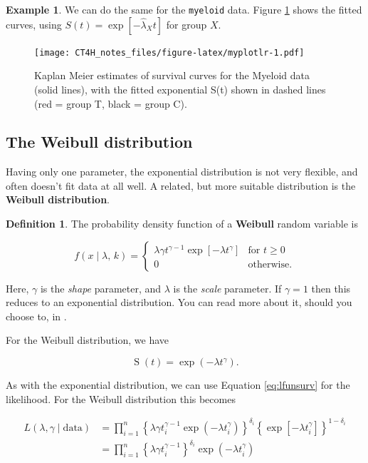 \documentclass[
  openany]{book}
\theoremstyle{definition}
\newtheorem{definition}{Definition}[chapter]
\theoremstyle{definition}
\newtheorem{example}{Example}[chapter]
\theoremstyle{definition}
\theoremstyle{definition}
\theoremstyle{remark}
\begin{document}
\begin{example}
We can do the same for the \texttt{myeloid} data. Figure \ref{fig:myplotlr} shows the fitted curves, using \(S\left(t\right)=\exp\left[-\hat{\lambda}_Xt\right]\) for group \(X\).

\begin{figure}
\centering
\texttt{[image: CT4H\_notes\_files/figure-latex/myplotlr-1.pdf]}
\caption{\label{fig:myplotlr}Kaplan Meier estimates of survival curves for the Myeloid data (solid lines), with the fitted exponential S(t) shown in dashed lines (red = group T, black = group C).}
\end{figure}

\end{example}

\hypertarget{the-weibull-distribution}{%
\subsection{The Weibull distribution}\label{the-weibull-distribution}}

Having only one parameter, the exponential distribution is not very flexible, and often doesn't fit data at all well. A related, but more suitable distribution is the \textbf{Weibull distribution}.

\begin{definition}
The probability density function of a \textbf{Weibull} random variable is

\[
f\left(x\mid \lambda,\,k\right) = 
\begin{cases}
\lambda\gamma t^{\gamma-1}\exp\left[{-\lambda t^{\gamma}}\right] & \text{for }t\geq{0}\\
0 & \text{otherwise}.
\end{cases}
\]

Here, \(\gamma\) is the \emph{shape} parameter, and \(\lambda\) is the \emph{scale} parameter. If \(\gamma=1\) then this reduces to an exponential distribution. You can read more about it, should you choose to, in \citet{collett_surv}.
\end{definition}

For the Weibull distribution, we have

\[\operatorname{S}\left(t\right) = \exp\left(-\lambda t^{\gamma}\right). \]

As with the exponential distribution, we can use Equation \eqref{eq:lfunsurv} for the likelihood. For the Weibull distribution this becomes

\begin{align*}
L\left(\lambda,\gamma\mid{\text{data}}\right) & = \prod\limits_{i=1}^n\left\lbrace \lambda \gamma t_i^{\gamma-1}\exp\left(-\lambda t_i^{\gamma}\right) \right\rbrace^{\delta_i} \left\lbrace \exp\left[-\lambda t_i^{\gamma}\right] \right\rbrace ^{1-\delta_i}\\
& = \prod\limits_{i=1}^n \left\lbrace \lambda\gamma t_i^{\gamma-1} \right\rbrace^{\delta_i} \exp\left(-\lambda t_i^{\gamma}\right)
\end{align*}
\end{document}

